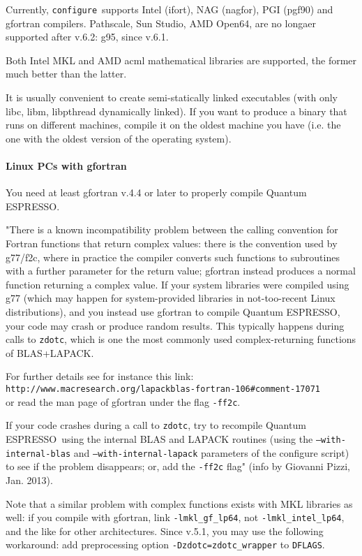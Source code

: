 \documentclass[12pt,a4paper]{article}
\def\qe{{\sc Quantum ESPRESSO}}
\def\configure{\texttt{configure}}
\begin{document}
Currently, \configure\ supports Intel (ifort), NAG (nagfor), PGI (pgf90)
and gfortran compilers. Pathscale, Sun Studio, AMD Open64, are no
longaer supported after v.6.2: g95, since v.6.1.

Both Intel MKL and AMD acml mathematical libraries are supported, the
former much better than the latter.

It is usually convenient to create semi-statically linked executables (with only
libc, libm, libpthread dynamically linked). If you want to produce a binary
that runs on different machines, compile it on the oldest machine you have
(i.e. the one with the oldest version of the operating system).

\paragraph{Linux PCs with gfortran}

You need at least gfortran v.4.4 or later to properly compile \qe.

"There is a known incompatibility problem between the calling
convention for Fortran functions that return complex values: there is the
convention used by
g77/f2c, where in practice the compiler converts such functions to subroutines
with a further parameter for the return value; gfortran instead produces a
normal function returning a complex value.
If your system libraries were compiled using g77 (which may happen for
system-provided libraries in not-too-recent Linux distributions),
and you instead use gfortran to compile \qe, your code
may crash or produce random results. This typically happens
during calls to \texttt{zdotc}, which is one the most commonly used
complex-returning functions of BLAS+LAPACK.

For further details see for instance this link:\\
\texttt{http://www.macresearch.org/lapackblas-fortran-106\#comment-17071}\\
or read the man page of gfortran under the flag \texttt{-ff2c}.

If your code crashes during a call to \texttt{zdotc},
try to recompile \qe\ using the internal BLAS and LAPACK
routines (using the \texttt{--with-internal-blas} and
\texttt{--with-internal-lapack} parameters of the configure script)
to see if the problem disappears; or, add the \texttt{-ff2c} flag"
(info by Giovanni Pizzi, Jan. 2013).

Note that a similar problem with complex functions exists with MKL libraries
as well: if you compile with gfortran, link \texttt{-lmkl\_gf\_lp64},
not \texttt{-lmkl\_intel\_lp64}, and the like for other architectures.
Since v.5.1, you may use the following workaround:
add preprocessing option \texttt{-Dzdotc=zdotc\_wrapper} to \texttt{DFLAGS}.
\end{document}
